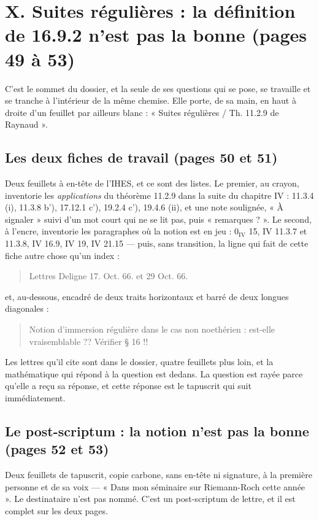 \documentclass[11pt,a4paper]{article}
\begin{document}
\section*{X. Suites régulières : la définition de 16.9.2 n'est pas la bonne (pages 49 à 53)}

C'est le sommet du dossier, et la seule de ses questions qui se pose, se
travaille et se tranche à l'intérieur de la même chemise. Elle porte, de sa
main, en haut à droite d'un feuillet par ailleurs blanc : « Suites régulières /
Th. 11.2.9 de Raynaud ».

\subsection*{Les deux fiches de travail (pages 50 et 51)}

Deux feuillets à en-tête de l'IHES, et ce sont des listes. Le premier, au crayon,
inventorie les \emph{applications} du théorème 11.2.9 dans la suite du chapitre
IV : 11.3.4 (i), 11.3.8 b'), 17.12.1 c'), 19.2.4 c'), 19.4.6 (ii), et une note
soulignée, « À signaler » suivi d'un mot court qui ne se lit pas, puis
« remarques ? ». Le second, à l'encre, inventorie
les paragraphes où la notion est en jeu : $0_{\mathrm{IV}}$ 15, IV 11.3.7 et
11.3.8, IV 16.9, IV 19, IV 21.15 — puis, sans transition, la ligne qui fait de
cette fiche autre chose qu'un index :

\begin{quote}
Lettres Deligne 17. Oct. 66. et 29 Oct. 66.
\end{quote}

et, au-dessous, encadré de deux traits horizontaux et barré de deux longues
diagonales :

\begin{quote}
Notion d'immersion régulière dans le cas non noethérien : est-elle
vraisemblable ?? Vérifier § 16 !!
\end{quote}

Les lettres qu'il cite sont dans le dossier, quatre feuillets plus loin, et la
mathématique qui répond à la question est dedans. La question est rayée parce
qu'elle a reçu sa réponse, et cette réponse est le tapuscrit qui suit
immédiatement.

\subsection*{Le post-scriptum : la notion n'est pas la bonne (pages 52 et 53)}

Deux feuillets de tapuscrit, copie carbone, sans en-tête ni signature, à la
première personne et de sa voix — « Dans mon séminaire sur Riemann-Roch cette
année ». Le destinataire n'est pas nommé. C'est un post-scriptum de lettre, et
il est complet sur les deux pages.
\end{document}
